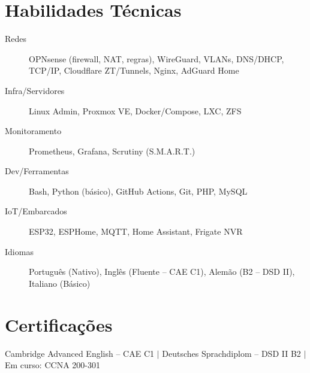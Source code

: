 \documentclass[10.5pt]{article}
\begin{document}
\section{Habilidades T\'{e}cnicas}
\begin{description}
    \item[Redes] OPNsense (firewall, NAT, regras), WireGuard, VLANs, DNS/DHCP, TCP/IP, Cloudflare ZT/Tunnels, Nginx, AdGuard Home
    \item[Infra/Servidores] Linux Admin, Proxmox VE, Docker/Compose, LXC, ZFS
    \item[Monitoramento] Prometheus, Grafana, Scrutiny (S.M.A.R.T.)
    \item[Dev/Ferramentas] Bash, Python (b\'{a}sico), GitHub Actions, Git, PHP, MySQL
    \item[IoT/Embarcados] ESP32, ESPHome, MQTT, Home Assistant, Frigate NVR
    \item[Idiomas] Portugu\^{e}s (Nativo), Ingl\^{e}s (Fluente -- CAE C1), Alem\~{a}o (B2 -- DSD II), Italiano (B\'{a}sico)
\end{description}

\section{Certifica\c{c}\~{o}es}
Cambridge Advanced English -- CAE C1 $|$ Deutsches Sprachdiplom -- DSD II B2 $|$ Em curso: CCNA 200-301
\end{document}
